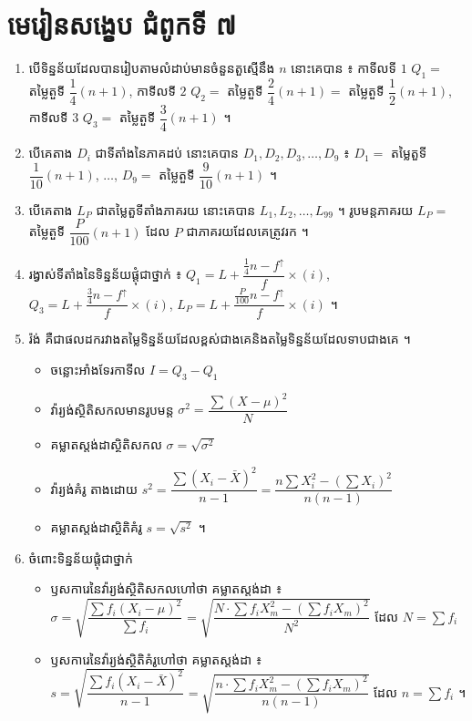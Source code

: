\section*{មេរៀនសង្ខេប ជំពូកទី ៧}
\begin{note}[មេរៀនសង្ខេប]
\begin{enumerate}[1]
  \item បើទិន្នន័យដែលបានរៀបតាមលំដាប់មានចំនួនតួស្មើនឹង $n$ នោះគេបាន ៖ កាទីលទី $1$ $Q_1 =$ តម្លៃតួទី $\dfrac{1}{4}(n + 1)$, កាទីលទី $2$ $Q_2 =$ តម្លៃតួទី $\dfrac{2}{4}(n + 1) =$ តម្លៃតួទី $\dfrac{1}{2}(n + 1)$, កាទីលទី $3$ $Q_3 =$ តម្លៃតួទី $\dfrac{3}{4}(n + 1)$ ។
  \item បើគេតាង $D_i$ ជាទីតាំងនៃភាគដប់ នោះគេបាន $D_1, D_2, D_3, \dots, D_9$ ៖ $D_1 =$ តម្លៃតួទី $\dfrac{1}{10}(n + 1)$, $\dots$, $D_9 =$ តម្លៃតួទី $\dfrac{9}{10}(n + 1)$ ។
  \item បើគេតាង $L_P$ ជាតម្លៃតួទីតាំងភាគរយ នោះគេបាន $L_1, L_2, \dots, L_{99}$ ។ រូបមន្តភាគរយ $L_P =$ តម្លៃតួទី $\dfrac{P}{100}(n + 1)$ ដែល $P$ ជាភាគរយដែលគេត្រូវរក ។
  \item រង្វាស់ទីតាំងនៃទិន្នន័យផ្ដុំជាថ្នាក់ ៖ $Q_1 = L + \dfrac{\frac{1}{4}n - f^{\uparrow}}{f}\times(i)$, $Q_3 = L + \dfrac{\frac{3}{4}n - f^{\uparrow}}{f}\times(i)$, $L_P = L + \dfrac{\frac{P}{100}n - f^{\uparrow}}{f}\times(i)$ ។
  \item រ៉ង់ គឺជាផលដករវាងតម្លៃទិន្នន័យដែលខ្ពស់ជាងគេនិងតម្លៃទិន្នន័យដែលទាបជាងគេ ។
  \begin{itemize}
    \item ចន្លោះអាំងទែរកាទីល $I = Q_3 - Q_1$
    \item វ៉ារ្យង់ស្ថិតិសកលមានរូបមន្ត $\sigma^2 = \dfrac{\sum(X - \mu)^2}{N}$
    \item គម្លាតស្តង់ដាស្ថិតិសកល $\sigma = \sqrt{\sigma^2}$
    \item វ៉ារ្យង់គំរូ តាងដោយ $s^2 = \dfrac{\sum(X_i - \bar{X})^2}{n - 1} = \dfrac{n\sum X_i^2 - \left(\sum X_i\right)^2}{n(n - 1)}$
    \item គម្លាតស្តង់ដាស្ថិតិគំរូ $s = \sqrt{s^2}$ ។
  \end{itemize}
  \item ចំពោះទិន្នន័យផ្ដុំជាថ្នាក់
  \begin{itemize}
    \item ឫសការេនៃវ៉ារ្យង់ស្ថិតិសកលហៅថា គម្លាតស្តង់ដា ៖ $\sigma = \sqrt{\dfrac{\sum f_i(X_i - \mu)^2}{\sum f_i}} = \sqrt{\dfrac{N\cdot\sum f_iX_m^2 - \left(\sum f_iX_m\right)^2}{N^2}}$ ដែល $N = \sum f_i$
    \item ឫសការេនៃវ៉ារ្យង់ស្ថិតិគំរូហៅថា គម្លាតស្តង់ដា ៖ $s = \sqrt{\dfrac{\sum f_i(X_i - \bar{X})^2}{n - 1}} = \sqrt{\dfrac{n\cdot\sum f_iX_m^2 - \left(\sum f_iX_m\right)^2}{n(n - 1)}}$ ដែល $n = \sum f_i$ ។
  \end{itemize}
\end{enumerate}
\end{note}

